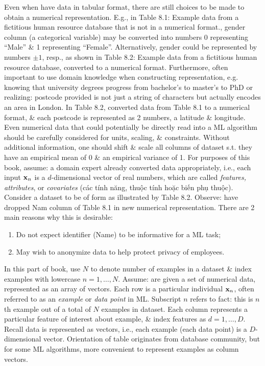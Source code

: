 \documentclass{article}
\begin{document}
\begin{enumerate}
\begin{itemize}
\begin{itemize}
\begin{itemize}
				Even when have data in tabular format, there are still choices to be made to obtain a numerical representation. E.g., in {\sf Table 8.1: Example data from a fictitious human resource database that is not in a numerical format.}, gender column (a categorical variable) may be converted into numbers 0 representing ``Male'' \& 1 representing ``Female''. Alternatively, gender could be represented by numbers $\pm1$, resp., as shown in {\sf Table 8.2: Example data from a fictitious human resource database, converted to a numerical format}. Furthermore, often important to use domain knowledge when constructing representation, e.g. knowing that university degrees progress from bachelor's to master's to PhD or realizing: postcode provided is not just a string of characters but actually encodes an area in London. In Table 8.2, converted data from Table 8.1 to a numerical format, \& each postcode is represented as 2 numbers, a latitude \& longitude. Even numerical data that could potentially be directly read into a ML algorithm should be carefully considered for units, scaling, \& constraints. Without additional information, one should shift \& scale all columns of dataset s.t. they have an empirical mean of 0 \& an empirical variance of 1. For purposes of this book, assume: a domain expert already converted data appropriately, i.e., each input ${\bf x}_n$ is a $d$-dimensional vector of real numbers, which are called {\it features, attributes}, or {\it covariates} (các tính năng, thuộc tính hoặc biến phụ thuộc). Consider a dataset to be of form as illustrated by Table 8.2. Observe: have dropped Nam column of Table 8.1 in new numerical representation. There are 2 main reasons why this is desirable:
				\begin{enumerate}
					\item Do not expect identifier (Name) to be informative for a ML task;
					\item May wish to anonymize data to help protect privacy of employees.
				\end{enumerate}
				In this part of book, use $N$ to denote number of examples in a dataset \& index examples with lowercase $n = 1,\ldots,N$. Assume: are given a set of numerical data, represented as an array of vectors. Each row is a particular individual ${\bf x}_n$, often referred to as an {\it example} or {\it data point} in ML. Subscript $n$ refers to fact: this is $n$th example out of a total of $N$ examples in dataset. Each column represents a particular feature of interest about example, \& index features as $d = 1,\ldots,D$. Recall data is represented as vectors, i.e., each example (each data point) is a $D$-dimensional vector. Orientation of table originates from database community, but for some ML algorithms, more convenient to represent examples as column vectors.
				

\end{itemize}
\end{itemize}
\end{itemize}
\end{enumerate}
\end{document}
